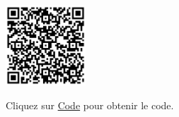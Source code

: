 \documentclass[a4paper,12pt]{report}
\begin{document}
\begin{minipage}{0.5\textwidth}
    \includegraphics[height=3cm]{Code TC103.png}
\end{minipage}%
\begin{minipage}{0.5\textwidth}
    Cliquez sur \href{https://github.com/DexterTaha/Controllino-PLC-Sample/blob/main/TC100/TC103_Interrupteur_marche_arret_retard/TC103_Interrupteur_marche_arret_retard.ino}{Code} pour obtenir le code.
\end{minipage}

\newpage
\end{document}
